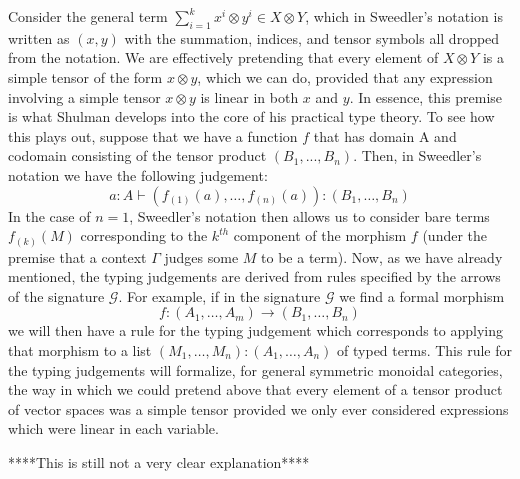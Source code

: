 \documentclass[pra,floatfix,
amsmath,superscriptaddress, 12pt]{article}
\theoremstyle{definition}
\newcommand{\cG}{\mathcal{G}}
\begin{document}
Consider the general term $ \sum_{i=1}^{k}x^{i}\otimes y^{i} \in X \otimes Y$, which in Sweedler's notation is written as $(x, y)$ with the summation, indices, and tensor symbols all dropped from the notation. We are effectively pretending that every element of $X\otimes Y$ is a simple tensor of the form $x \otimes y$, which we can do, provided that any expression involving a simple tensor $x\otimes y$ is linear in both $x$ and $y$. In essence, this premise is what Shulman develops into the core of his practical type theory. To see how this plays out, suppose that we have a function $f$ that has domain A and codomain consisting of the tensor product $(B_1,...,B_n)$. Then, in Sweedler's notation we have the following judgement:
\[
a:A\vdash\left(f_{\left(1\right)}\left(a\right),\dots,f_{\left(n\right)}\left(a\right)\right):\left(B_{1},\dots,B_{n}\right)
\]
In the case of $n=1$, Sweedler's notation then allows us to consider bare terms $f_{(k)}(M)$ corresponding to the $k^{th}$ component of the morphism $f$ (under the premise that a context $\Gamma$ judges some $M$ to be a term). Now, as we have already mentioned, the typing judgements are derived from rules specified by the arrows of the signature $\cG$. For example, if
in the signature $\mathcal{G}$ we find a formal morphism
$$ f:\left(A_{1},\dots,A_{m}\right)\longrightarrow\left(B_{1},\dots,B_{n}\right)$$ 
we will then have a rule for the typing judgement which corresponds to applying that morphism to a list  $\left(M_{1},\dots,M_{n}\right):\left(A_{1},\dots,A_{n}\right)$ of typed terms. 
%
This rule for the typing judgements will formalize, for general symmetric monoidal categories, the way in which we could pretend above that every element of a tensor product of vector spaces was a simple tensor provided we only ever considered expressions which were linear in each variable.

{\color{red} ****This is still not a very clear explanation****}





\end{document}

